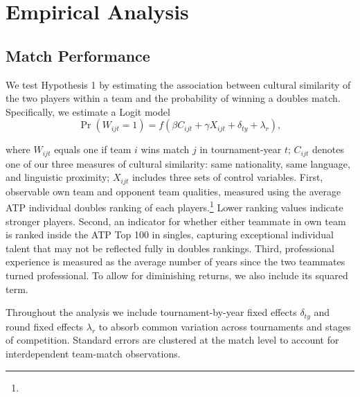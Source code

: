 \documentclass[10pt]{article}
\begin{document}
\section{Empirical Analysis}

\subsection{Match Performance}
We test Hypothesis 1 by  estimating the association between cultural similarity of the two players within a team and the probability of winning a doubles match. Specifically, we estimate a Logit model
\begin{equation}\label{matchoutcome}
  \operatorname{Pr}(W_{ijt} = 1) = f(\beta C_{ijt} + \gamma X_{ijt} + \delta_{ty} + \lambda_r) , 
\end{equation}


where $W_{ijt}$ equals one if team $i$ wins match $j$ in tournament-year $t$; $C_{ijt}$ denotes one of our three measures of cultural similarity: same nationality, same language, and linguistic proximity; 
$X_{ijt}$ includes three sets of control variables. First, observable own team and opponent team qualities, measured using the average ATP individual doubles ranking of each  players.\footnote{} Lower ranking values indicate stronger players. Second, an indicator for whether either teammate in own team is ranked inside the ATP Top 100 in singles, capturing exceptional individual talent that may not be reflected fully in doubles rankings. Third, professional experience is measured as the average number of years since the two teammates turned professional. To allow for diminishing returns, we also include its squared term. 

Throughout the analysis we include tournament-by-year fixed effects $\delta_{ty}$ and round fixed effects $\lambda_r$ to absorb common variation across tournaments and stages of competition. Standard errors are clustered at the match level to account for interdependent team-match observations.
\end{document}
